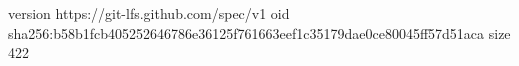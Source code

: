 version https://git-lfs.github.com/spec/v1
oid sha256:b58b1fcb405252646786e36125f761663eef1c35179dae0ce80045ff57d51aca
size 422
